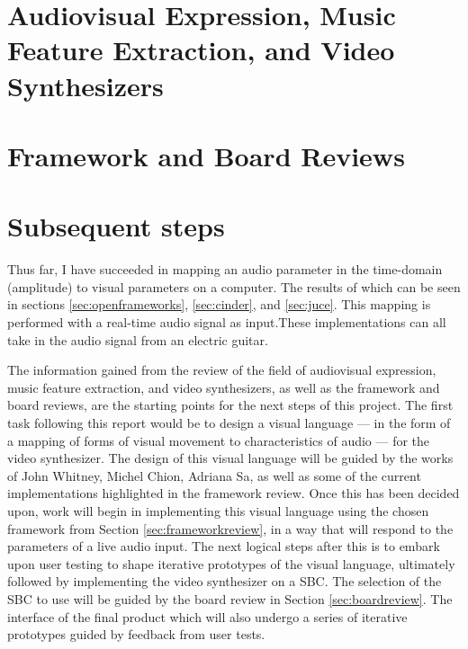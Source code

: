 \documentclass{report}
\begin{document}
\chapter{Audiovisual Expression, Music Feature Extraction, and Video Synthesizers}




\chapter{Framework and Board Reviews}



\chapter{Subsequent steps}

Thus far, I have succeeded in mapping an audio parameter in the time-domain (amplitude) to visual parameters on a computer. The results of which can be seen in sections \ref{sec:openframeworks}, \ref{sec:cinder}, and \ref{sec:juce}. This mapping is performed with a real-time audio signal as input.\footnotemark These implementations can all take in the audio signal from an electric guitar. \par
{}


The information gained from the review of the field of audiovisual expression, music feature extraction, and video synthesizers, as well as the framework and board reviews, are the starting points for the next steps of this project. The first task following this report would be to design a visual language --- in the form of a mapping of forms of visual movement to characteristics of audio --- for the video synthesizer. The design of this visual language will be guided by the works of John Whitney, Michel Chion, Adriana Sa, as well as some of the current implementations highlighted in the framework review. Once this has been decided upon, work will begin in implementing this visual language using the chosen framework from Section \ref{sec:frameworkreview}, in a way that will respond to the parameters of a live audio input. The next logical steps after this is to embark upon user testing to shape iterative prototypes of the visual language, ultimately followed by implementing the video synthesizer on a SBC. The selection of the SBC to use will be guided by the board review in Section \ref{sec:boardreview}. The interface of the final product which will also undergo a series of iterative prototypes guided by feedback from user tests.
\printbibliography
\end{document}
